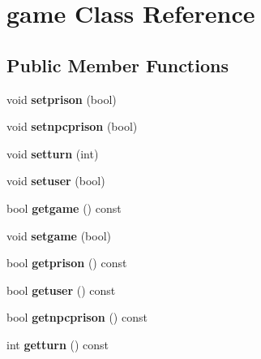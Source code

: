 \hypertarget{classgame}{}\section{game Class Reference}
\label{classgame}
\subsection*{Public Member Functions}
\begin{DoxyCompactItemize}
\item 
\mbox{\label{classgame_a0e643a18ee08dce88fffacf4e6784fc4}} 
void {\bfseries setprison} (bool)
\item 
\mbox{\label{classgame_aa06eb20c20d8d1b1be4964e058b80384}} 
void {\bfseries setnpcprison} (bool)
\item 
\mbox{\label{classgame_a50972e32b499cc32e682d1e259f77e33}} 
void {\bfseries setturn} (int)
\item 
\mbox{\label{classgame_a790909d5a72e268bda59a61ea9992204}} 
void {\bfseries setuser} (bool)
\item 
\mbox{\label{classgame_a5e3bb6ad959cf03ed41a70bf98213627}} 
bool {\bfseries getgame} () const
\item 
\mbox{\label{classgame_a496a633a2afb1b31219d2e3bff6e5175}} 
void {\bfseries setgame} (bool)
\item 
\mbox{\label{classgame_ac97131d2904e7e5f8126e9c7ac421ae8}} 
bool {\bfseries getprison} () const
\item 
\mbox{\label{classgame_a634aefd487aafcd236558243f4186a31}} 
bool {\bfseries getuser} () const
\item 
\mbox{\label{classgame_ae21fe00517fffc6609cf8a108a49835b}} 
bool {\bfseries getnpcprison} () const
\item 
\mbox{\label{classgame_a179e80cc7635a7188e9112bcb0b95fd6}} 
int {\bfseries getturn} () const
\end{DoxyCompactItemize}
